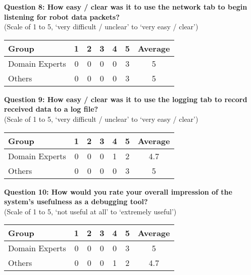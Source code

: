 \noindent\textbf{Question 8: How easy / clear was it to use the network tab to begin listening for robot data packets?}\\(Scale of 1 to 5, `very difficult / unclear' to `very easy / clear')

\begin{center}
\begin{tabular}{ l c c c c c c }
 Group & 1 & 2 & 3 & 4 & 5 & Average \\ 
 \hline
 Domain Experts & 0 & 0 & 0 & 0 & 3 & 5 \\
 Others 		& 0 & 0 & 0 & 0 & 3 & 5 \\
\end{tabular}
\end{center}

\noindent\textbf{Question 9: How easy / clear was it to use the logging tab to record received data to a log file?}\\(Scale of 1 to 5, `very difficult / unclear' to `very easy / clear')

\begin{center}
\begin{tabular}{ l c c c c c c }
 Group & 1 & 2 & 3 & 4 & 5 & Average \\ 
 \hline
 Domain Experts & 0 & 0 & 0 & 1 & 2 & 4.7 \\
 Others 		& 0 & 0 & 0 & 0 & 3 & 5 \\
\end{tabular}
\end{center}

\noindent\textbf{Question 10: How would you rate your overall impression of the system's usefulness as a debugging tool?}\\(Scale of 1 to 5, `not useful at all' to `extremely useful')

\begin{center}
\begin{tabular}{ l c c c c c c }
 Group & 1 & 2 & 3 & 4 & 5 & Average \\ 
 \hline
 Domain Experts & 0 & 0 & 0 & 0 & 3 & 5 \\
 Others 		& 0 & 0 & 0 & 1 & 2 & 4.7 \\
\end{tabular}
\end{center}

